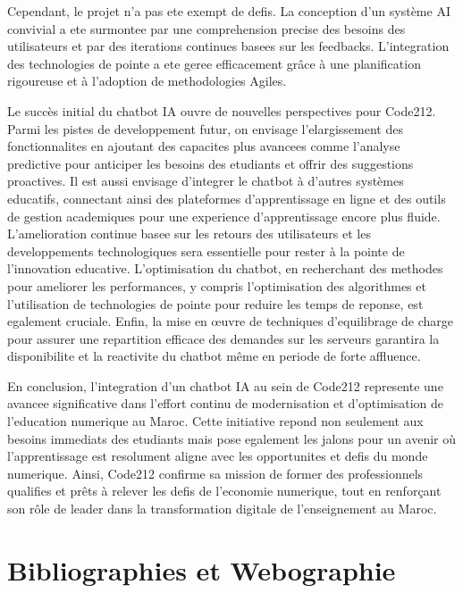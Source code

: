 \documentclass[a4paper, 11pt, openany]{report}
\begin{document}
Cependant, le projet n'a pas ete exempt de defis. La conception d'un système AI convivial a ete surmontee par une comprehension precise des besoins des utilisateurs et par des iterations continues basees sur les feedbacks. L'integration des technologies de pointe a ete geree efficacement grâce à une planification rigoureuse et à l'adoption de methodologies Agiles.
\newline

Le succès initial du chatbot IA ouvre de nouvelles perspectives pour Code212. Parmi les pistes de developpement futur, on envisage l'elargissement des fonctionnalites en ajoutant des capacites plus avancees comme l'analyse predictive pour anticiper les besoins des etudiants et offrir des suggestions proactives. Il est aussi envisage d'integrer le chatbot à d'autres systèmes educatifs, connectant ainsi des plateformes d'apprentissage en ligne et des outils de gestion academiques pour une experience d'apprentissage encore plus fluide. L'amelioration continue basee sur les retours des utilisateurs et les developpements technologiques sera essentielle pour rester à la pointe de l'innovation educative. L'optimisation du chatbot, en recherchant des methodes pour ameliorer les performances, y compris l'optimisation des algorithmes et l'utilisation de technologies de pointe pour reduire les temps de reponse, est egalement cruciale. Enfin, la mise en œuvre de techniques d'equilibrage de charge pour assurer une repartition efficace des demandes sur les serveurs garantira la disponibilite et la reactivite du chatbot même en periode de forte affluence.
\newline

En conclusion, l'integration d'un chatbot IA au sein de Code212 represente une avancee significative dans l'effort continu de modernisation et d'optimisation de l'education numerique au Maroc. Cette initiative repond non seulement aux besoins immediats des etudiants mais pose egalement les jalons pour un avenir où l'apprentissage est resolument aligne avec les opportunites et defis du monde numerique. Ainsi, Code212 confirme sa mission de former des professionnels qualifies et prêts à relever les defis de l'economie numerique, tout en renforçant son rôle de leader dans la transformation digitale de l'enseignement au Maroc.



\chapter*{Bibliographies et Webographie}
\end{document}
